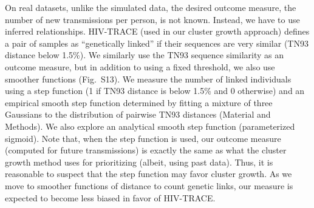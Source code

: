 \documentclass[a4paper,11pt]{article}
\newcommand{\PLWH}{sample\xspace}
\begin{document}
On real datasets, unlike the simulated data, the desired outcome measure, the number of new transmissions per person, is not known. 
Instead, we have to use inferred relationships.
HIV-TRACE (used in our cluster growth approach) defines
a pair of \PLWH{s} as ``genetically linked''
if their sequences are very similar (TN93 distance below 1.5\%).
We similarly use the TN93 sequence similarity as an outcome measure, but in addition to using a fixed threshold, we also use smoother functions (Fig.~S13).
We measure the number of linked individuals using a step function (1 if TN93 distance is below 1.5\% and 0 otherwise) 
and an empirical smooth step function determined by fitting a mixture of three Gaussians to the distribution of pairwise TN93 distances (Material and Methods).
We also explore an analytical smooth step function (parameterized sigmoid).  
Note that, when the step function is used, our outcome measure (computed for future transmissions) is exactly the same as what the cluster growth method uses for prioritizing (albeit, using past data). 
Thus, it is reasonable to suspect that the step function may favor cluster growth. 
As we move to smoother functions of distance to count genetic links, our measure is expected to become less biased in favor of HIV-TRACE. 
\end{document}
